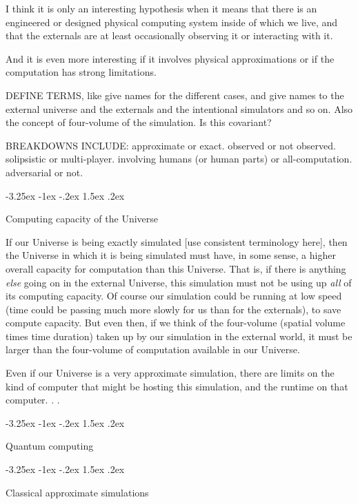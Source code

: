\documentclass[12pt,letterpaper]{article}
\makeatletter
\renewcommand\section{\@startsection {section}{1}{\z@}%
  {-3.25ex \@plus -1ex \@minus -.2ex}%
  {1.5ex \@plus .2ex}%
  {\raggedright\normalfont\large\bfseries}}
\makeatother
\begin{document}
I think it is only an interesting hypothesis when it means that there is an engineered or designed physical computing system inside of which we live, and that the externals are at least occasionally observing it or interacting with it.

And it is even more interesting if it involves physical approximations or if the computation has strong limitations.

DEFINE TERMS, like give names for the different cases, and give names to the external universe and the externals and the intentional simulators and so on. Also the concept of four-volume of the simulation. Is this covariant?

BREAKDOWNS INCLUDE: approximate or exact. observed or not observed. solipsistic or multi-player. involving humans (or human parts) or all-computation. adversarial or not.

\section{Computing capacity of the Universe}

If our Universe is being exactly simulated [use consistent terminology here], then the Universe in which it is being simulated must have, in some sense, a higher overall capacity for computation than this Universe.
That is, if there is anything \emph{else} going on in the external Universe, this simulation must not be using up \emph{all} of its computing capacity.
Of course our simulation could be running at low speed (time could be passing much more slowly for us than for the externals), to save compute capacity.
But even then, if we think of the four-volume (spatial volume times time duration) taken up by our simulation in the external world, it must be larger than the four-volume of computation available in our Universe.

Even if our Universe is a very approximate simulation, there are limits on the kind of computer that might be hosting this simulation, and the runtime on that computer. .  .


\section{Quantum computing}

\section{Classical approximate simulations}
\end{document}
